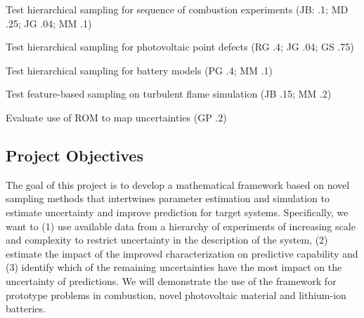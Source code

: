 \documentclass[11pt]{article}
\begin{document}
\begin{compactitem}
\setlength{\itemsep}{0pt}\setlength{\parskip}{0pt}\setlength{\parsep}{0pt}
\item Test hierarchical sampling for sequence of combustion experiments
(JB: .1; MD .25; JG .04; MM .1)
\item Test hierarchical sampling for photovoltaic point defects
(RG .4; JG .04; GS .75)
\item Test hierarchical sampling for battery models
(PG .4; MM .1)
\item Test feature-based sampling on turbulent flame simulation
(JB .15; MM .2)
\item Evaluate use of ROM to map uncertainties
(GP .2)
\end{compactitem}

\subsection*{Project Objectives}

The goal of this project is to develop a mathematical framework  
based on novel sampling methods that
intertwines parameter estimation and simulation 
to estimate uncertainty and improve prediction for target systems.
Specifically, we want to
(1) use available data from a hierarchy
of experiments of increasing scale and complexity to restrict
uncertainty in the description of the system, (2) estimate the impact of the improved characterization
on predictive capability and (3) identify which of the remaining uncertainties have the most impact
on the uncertainty of predictions.
We will demonstrate the use of the framework for prototype problems in combustion,
novel photovoltaic material and lithium-ion batteries.




 
\end{document}
